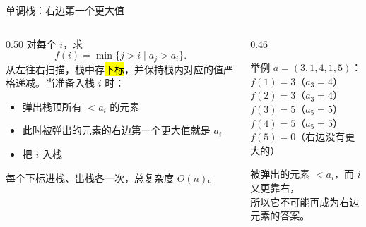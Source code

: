\documentclass[aspectratio=169]{beamer}
\begin{document}
\begin{frame}{单调栈：右边第一个更大值}
    \begin{columns}[T]
        \begin{column}{0.50\textwidth}
            \small
            对每个 $i$，求
            \[
                f(i)=\min\{j>i\mid a_j>a_i\}.
            \]
            从左往右扫描，栈中存\hl{下标}，并保持栈内对应的值严格递减。当准备入栈 $i$ 时：
            \begin{itemize}
                \item 弹出栈顶所有 $< a_i$ 的元素
                \item 此时被弹出的元素的右边第一个更大值就是 $a_i$
                \item 把 $i$ 入栈
            \end{itemize}
            \vspace{0.4em}
            每个下标进栈、出栈各一次，总复杂度 $O(n)$。
        \end{column}
        \begin{column}{0.46\textwidth}
            \begin{exampleblock}{举例}
                \footnotesize
                $a=(3,1,4,1,5)$：\\
                $f(1)=3$（$a_3=4$）\\
                $f(2)=3$（$a_3=4$）\\
                $f(3)=5$（$a_5=5$）\\
                $f(4)=5$（$a_5=5$）\\
                $f(5)=0$（右边没有更大的）
            \end{exampleblock}
            \vspace{0.3em}
            \footnotesize
            被弹出的元素 $< a_i$，而 $i$ 又更靠右，\\
            所以它不可能再成为右边元素的答案。
        \end{column}
    \end{columns}
\end{frame}
\end{document}
